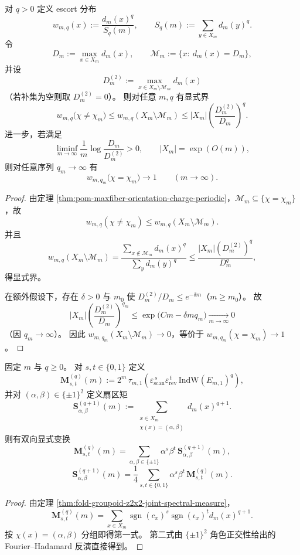 \begin{theorem}\label{thm:xi-time-part9h-escort-sector-freezing}
对 \(q>0\) 定义 escort 分布
\[
w_{m,q}(x):=\frac{d_m(x)^q}{S_q(m)},\qquad
S_q(m):=\sum_{y\in X_m}d_m(y)^q.
\]
令
\[
D_m:=\max_{x\in X_m}d_m(x),\qquad
\mathcal M_m:=\{x:\ d_m(x)=D_m\},
\]
并设
\[
D_m^{(2)}:=
\max_{x\in X_m\setminus\mathcal M_m}d_m(x)
\]
（若补集为空则取 \(D_m^{(2)}=0\)）。
则对任意 \(m,q\) 有显式界
\[
w_{m,q}\!\bigl(\chi\neq\chi_m\bigr)
\le
w_{m,q}(X_m\setminus\mathcal M_m)
\le
|X_m|\left(\frac{D_m^{(2)}}{D_m}\right)^q.
\]
进一步，若满足
\[
\liminf_{m\to\infty}\frac1m\log\frac{D_m}{D_m^{(2)}}>0,\qquad
|X_m|=\exp(O(m)),
\]
则对任意序列 \(q_m\to\infty\) 有
\[
w_{m,q_m}\!\bigl(\chi=\chi_m\bigr)\longrightarrow 1\qquad(m\to\infty).
\]
\end{theorem}
\begin{proof}
由定理 \ref{thm:pom-maxfiber-orientation-charge-periodic}，\(\mathcal M_m\subseteq\{\chi=\chi_m\}\)，故
\[
w_{m,q}(\chi\neq\chi_m)\le w_{m,q}(X_m\setminus\mathcal M_m).
\]
并且
\[
w_{m,q}(X_m\setminus\mathcal M_m)
=
\frac{\sum_{x\notin\mathcal M_m}d_m(x)^q}{\sum_{y}d_m(y)^q}
\le
\frac{|X_m|(D_m^{(2)})^q}{D_m^q},
\]
得显式界。

在额外假设下，存在 \(\delta>0\) 与 \(m_0\) 使 \(D_m^{(2)}/D_m\le e^{-\delta m}\)（\(m\ge m_0\)）。
故
\[
|X_m|\left(\frac{D_m^{(2)}}{D_m}\right)^{q_m}
\le
\exp\!\bigl(Cm-\delta m q_m\bigr)\xrightarrow[m\to\infty]{}0
\]
（因 \(q_m\to\infty\)）。
因此 \(w_{m,q_m}(X_m\setminus\mathcal M_m)\to0\)，等价于
\(
w_{m,q_m}(\chi=\chi_m)\to1
\)。
\end{proof}

\begin{theorem}\label{thm:xi-time-part9h-z2x2-hadamard-tomography}
固定 \(m\) 与 \(q\ge0\)。
对 \(s,t\in\{0,1\}\) 定义
\[
\mathbf M_{s,t}^{(q)}(m)
:=
2^m\,\tau_{m,1}\!\left(
\varepsilon_{\mathrm{scan}}^{\,s}\varepsilon_{\mathrm{rev}}^{\,t}\,
\mathrm{IndW}(E_{m,1})^q
\right),
\]
并对 \((\alpha,\beta)\in\{\pm1\}^2\) 定义扇区矩
\[
\mathbf S_{\alpha,\beta}^{(q+1)}(m)
:=
\sum_{\substack{x\in X_m\\ \chi(x)=(\alpha,\beta)}} d_m(x)^{q+1}.
\]
则有双向显式变换
\[
\mathbf M_{s,t}^{(q)}(m)
=
\sum_{\alpha,\beta\in\{\pm1\}}
\alpha^s\beta^t\,
\mathbf S_{\alpha,\beta}^{(q+1)}(m),
\]
\[
\mathbf S_{\alpha,\beta}^{(q+1)}(m)
=
\frac14\sum_{s,t\in\{0,1\}}
\alpha^s\beta^t\,
\mathbf M_{s,t}^{(q)}(m).
\]
\end{theorem}
\begin{proof}
由定理 \ref{thm:fold-groupoid-z2x2-joint-spectral-measure}，
\[
\mathbf M_{s,t}^{(q)}(m)
=
\sum_{x\in X_m}
\operatorname{sgn}(c_x)^s\operatorname{sgn}(\iota_x)^t
d_m(x)^{q+1}.
\]
按 \(\chi(x)=(\alpha,\beta)\) 分组即得第一式。
第二式由 \(\{\pm1\}^2\) 角色正交性给出的 Fourier--Hadamard 反演直接得到。
\end{proof}

